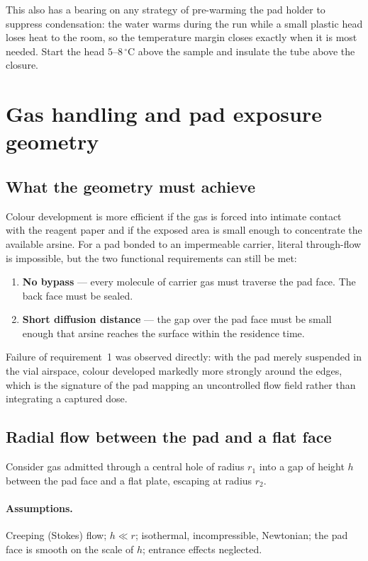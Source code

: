 \documentclass[11pt,a4paper]{article}
\begin{document}
This also has a bearing on any strategy of pre-warming the pad holder to
suppress condensation: the water warms during the run while a small plastic
head loses heat to the room, so the temperature margin closes exactly when
it is most needed. Start the head $5$--$8\,^\circ$C above the sample and
insulate the tube above the closure.

\section{Gas handling and pad exposure geometry}

\subsection{What the geometry must achieve}

Colour development is more efficient if the gas is forced into intimate
contact with the reagent paper and if the exposed area is small enough to
concentrate the available arsine. For a pad bonded to an impermeable
carrier, literal through-flow is impossible, but the two functional
requirements can still be met:
\begin{enumerate}[nosep]
  \item \textbf{No bypass} --- every molecule of carrier gas must traverse
        the pad face. The back face must be sealed.
  \item \textbf{Short diffusion distance} --- the gap over the pad face must
        be small enough that arsine reaches the surface within the residence
        time.
\end{enumerate}
Failure of requirement~1 was observed directly: with the pad merely
suspended in the vial airspace, colour developed markedly more strongly
around the edges, which is the signature of the pad mapping an
uncontrolled flow field rather than integrating a captured dose.

\subsection{Radial flow between the pad and a flat face}

Consider gas admitted through a central hole of radius $r_1$ into a gap of
height $h$ between the pad face and a flat plate, escaping at radius $r_2$.

\paragraph{Assumptions.} Creeping (Stokes) flow; $h \ll r$; isothermal,
incompressible, Newtonian; the pad face is smooth on the scale of $h$;
entrance effects neglected.
\end{document}
